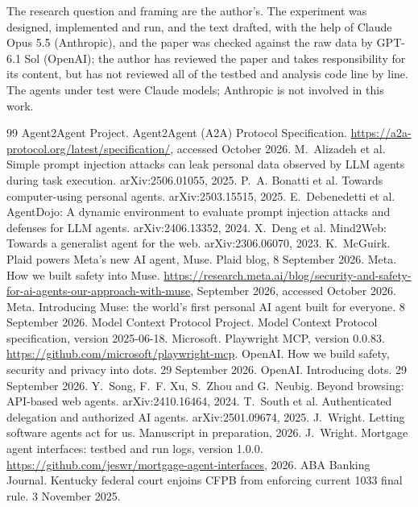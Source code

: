 \documentclass[11pt]{article}
\begin{document}
The research question and framing are the author's. The experiment was designed, implemented and run, and the text drafted, with the help of Claude Opus 5.5 (Anthropic), and the paper was checked against the raw data by GPT-6.1 Sol (OpenAI); the author has reviewed the paper and takes responsibility for its content, but has not reviewed all of the testbed and analysis code line by line. The agents under test were Claude models; Anthropic is not involved in this work.

\begin{thebibliography}{99}\small
{} Agent2Agent Project. Agent2Agent (A2A) Protocol Specification. \url{https://a2a-protocol.org/latest/specification/}, accessed October 2026.
 M.~Alizadeh et al. Simple prompt injection attacks can leak personal data observed by LLM agents during task execution. arXiv:2506.01055, 2025.
 P.~A. Bonatti et al. Towards computer-using personal agents. arXiv:2503.15515, 2025.
 E.~Debenedetti et al. AgentDojo: A dynamic environment to evaluate prompt injection attacks and defenses for LLM agents. arXiv:2406.13352, 2024.
 X.~Deng et al. Mind2Web: Towards a generalist agent for the web. arXiv:2306.06070, 2023.
 K.~McGuirk. Plaid powers Meta's new AI agent, Muse. Plaid blog, 8 September 2026.
 Meta. How we built safety into Muse. \url{https://research.meta.ai/blog/security-and-safety-for-ai-agents-our-approach-with-muse}, September 2026, accessed October 2026.
 Meta. Introducing Muse: the world's first personal AI agent built for everyone. 8 September 2026.
 Model Context Protocol Project. Model Context Protocol specification, version 2025-06-18.
 Microsoft. Playwright MCP, version 0.0.83. \url{https://github.com/microsoft/playwright-mcp}.
 OpenAI. How we build safety, security and privacy into dots. 29 September 2026.
 OpenAI. Introducing dots. 29 September 2026.
 Y.~Song, F.~F. Xu, S.~Zhou and G.~Neubig. Beyond browsing: API-based web agents. arXiv:2410.16464, 2024.
 T.~South et al. Authenticated delegation and authorized AI agents. arXiv:2501.09674, 2025.
 J.~Wright. Letting software agents act for us. Manuscript in preparation, 2026.
 J.~Wright. Mortgage agent interfaces: testbed and run logs, version 1.0.0. \url{https://github.com/jeswr/mortgage-agent-interfaces}, 2026.
 ABA Banking Journal. Kentucky federal court enjoins CFPB from enforcing current 1033 final rule. 3 November 2025.

\end{thebibliography}
\end{document}

